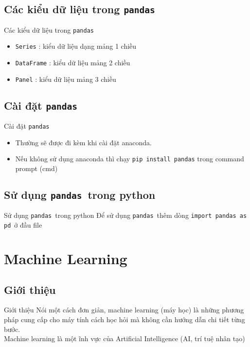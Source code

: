 \documentclass[11pt]{beamer}
\newcommand{\pandas}{\texttt{pandas}}
\begin{document}
\subsection{Các kiểu dữ liệu trong \pandas}
\begin{frame}{Các kiểu dữ liệu trong \pandas}
\begin{itemize}
\item \texttt{Series} : kiểu dữ liệu dạng mảng 1 chiều
\item \texttt{DataFrame} : kiểu dữ liệu mảng 2 chiều
\item \texttt{Panel} : kiểu dữ liệu mảng 3 chiều
\end{itemize}
\end{frame}
\subsection{Cài đặt \pandas}
\begin{frame}{Cài đặt \pandas}
\begin{itemize}
\item Thường sẽ được đi kèm khi cài đặt anaconda.
\item Nếu không sử dụng anaconda thì chạy \texttt{pip install pandas} trong command prompt (cmd)
\end{itemize}
\end{frame}
\subsection{Sử dụng \pandas\ trong python}
\begin{frame}{Sử dụng \pandas\ trong python}
Để sử dụng \pandas\, thêm dòng \texttt{import pandas as pd}\ ở đầu file
\end{frame}
\section{Machine Learning}
\subsection{Giới thiệu}
\begin{frame}{Giới thiệu}
Nói một cách đơn giản, machine learning (máy học) là những phương pháp cung cấp cho máy tính cách học hỏi mà không cần hướng dẫn chi tiết từng bước.\\
Machine learning là một ĩnh vực của Artificial Intelligence (AI, trí tuệ nhân tạo)
\end{frame}
\end{document}
